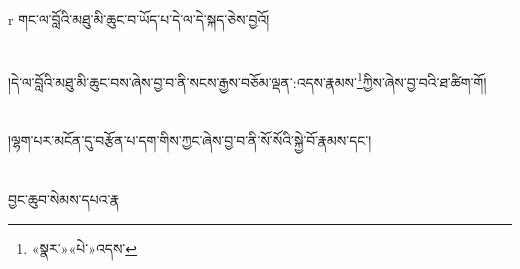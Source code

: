 r{ }གང་ལ་བློའི་མཐུ་མི་ཆུང་བ་ཡོད་པ་དེ་ལ་དེ་སྐད་ཅེས་བྱའོ།\chapter{ }།དེ་ལ་བློའི་མཐུ་མི་ཆུང་བས་ཞེས་བྱ་བ་ནི་སངས་རྒྱས་བཅོམ་ལྡན་:འདས་རྣམས་\footnote{«སྣར་»«པེ་»འདས་}ཀྱིས་ཞེས་བྱ་བའི་ཐ་ཚིག་གོ།\chapter{ }།ལྷག་པར་མངོན་དུ་བརྩོན་པ་དག་གིས་ཀྱང་ཞེས་བྱ་བ་ནི་སོ་སོའི་སྐྱེ་བོ་རྣམས་དང་།\chapter{ }བྱང་ཆུབ་སེམས་དཔའ་རྣ